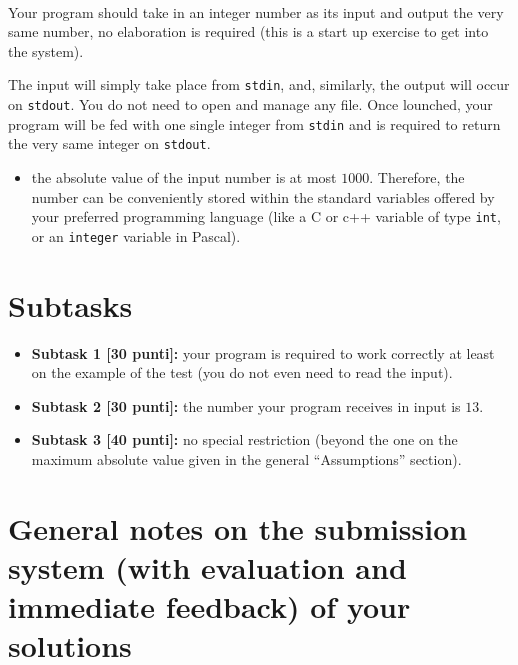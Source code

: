 \renewcommand{\nomebreve}{io\_std}
\renewcommand{\titolo}{Receiving input and sending output on the standard channels}

\mbox{\ }
\vspace{-1.9cm}

\introduzione{}

Your program should take in an integer number as its input
and output the very same number, no elaboration is required  
(this is a start up exercise to get into the system).

The input will simply take place from \texttt{stdin}, and, similarly,
the output will occur on \texttt{stdout}.
You do not need to open and manage any file.
Once lounched, your program will be fed with one single integer from \texttt{stdin} and is required to return the very same integer on \texttt{stdout}. 

   

\begin{itemize}[nolistsep, noitemsep]
  \item the absolute value of the input number is at most $1000$.
        Therefore, the number can be conveniently stored within the standard variables offered by your preferred programming language (like a C or c++ variable of type \texttt{int}, or an \texttt{integer} variable in Pascal).
\end{itemize}
  
  \section*{Subtasks}
  \begin{itemize}
    \item \textbf{Subtask 1 [30 punti]:} your program is required to work correctly at least on the example of the test (you do not even need to read the input).
    \item \textbf{Subtask 2 [30 punti]:} the number your program receives in input is $13$.
    \item \textbf{Subtask 3 [40 punti]:} no special restriction (beyond the one on the maximum absolute value given in the general ``Assumptions'' section).
  \end{itemize}


  \section*{General notes on the submission system (with evaluation and immediate feedback) of your solutions}

